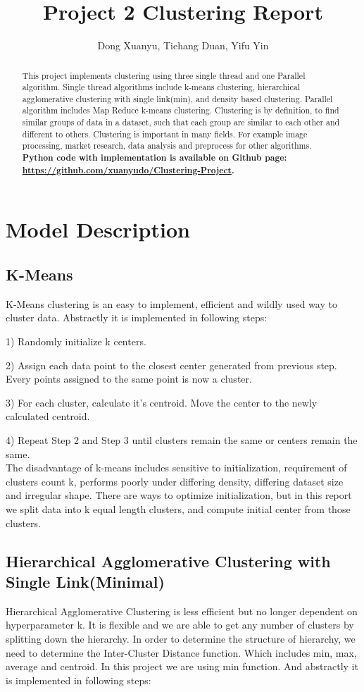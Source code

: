 \documentclass[fleqn]{llncs}
\title{Project 2 Clustering Report}
\author{Dong Xuanyu, Tiehang Duan, Yifu Yin}
\institute{Department of Computer Science and Engineering\\The State University of New York at Buffalo\\Buffalo, NY 14260, United States\\
\email{xuanyudo@buffalo.edu, yifuyin@buffalo.edu, tiehangd@buffalo.edu}}
\begin{document}
\maketitle

    \begin{abstract}
    This project implements clustering using three single thread and one Parallel algorithm. Single thread algorithms include k-means clustering, hierarchical agglomerative clustering with single link(min), and density based clustering. Parallel algorithm includes Map Reduce k-means clustering. Clustering is by definition, to find similar groups of data in a dataset, such that each group are similar to each other and different to others. Clustering is important in many fields. For example image processing, market research, data analysis and preprocess for other algorithms. \textbf{Python code with implementation is available on Github page: 
    \url{https://github.com/xuanyudo/Clustering-Project}.}
    \end{abstract}

\section{Model Description}
\subsection{K-Means}

K-Means clustering is an easy to implement, efficient and wildly used way to cluster data. Abstractly it is implemented in following steps:

1) Randomly initialize k centers.

2) Assign each data point to the closest center generated from previous step. Every points assigned to the same point is now a cluster.

3) For each cluster, calculate it's centroid. Move the center to the newly calculated centroid. 

4) Repeat Step 2 and Step 3 until clusters remain the same or centers remain the same.\\
The disadvantage of k-means includes sensitive to initialization, requirement of clusters count k, performs poorly under differing density, differing dataset size and irregular shape. There are ways to optimize initialization, but in this report we split data into k equal length clusters, and compute initial center from those clusters. 
    
\subsection{Hierarchical Agglomerative Clustering with Single Link(Minimal)}
Hierarchical Agglomerative Clustering is less efficient but no longer dependent on hyperparameter k. It is flexible and we are able to get any number of clusters by splitting down the hierarchy. In order to determine the structure of hierarchy, we need to determine the Inter-Cluster Distance function. Which includes min, max, average and centroid. In this project we are using min function. And abstractly it is implemented in following steps:
\end{document}
